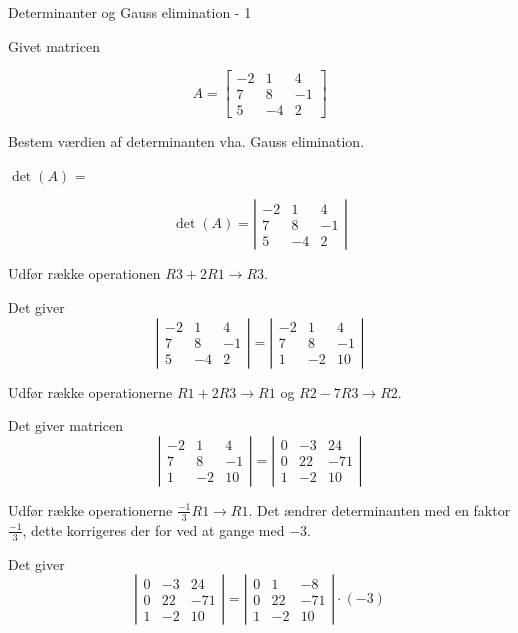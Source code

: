 \documentclass{article}
\begin{document}
\begin{exercise}{Determinanter og Gauss elimination - 1}
	
Givet matricen

\[
A = \left[\begin{array}{rrr}
-2 & 1 & 4 \\ 
7 & 8 & -1 \\
5 & -4 & 2
\end{array} \right]
\]

Bestem værdien af determinanten vha. Gauss elimination.

$\det(A)$ = 


\hint
\[
\det(A) = \left|\begin{array}{rrr}
-2 & 1 & 4 \\ 
7 & 8 & -1 \\
5 & -4 & 2
\end{array} \right|
\]


\hint
Udfør række operationen
$R3 + 2R1 \to R3$.

\hint
Det giver 
\[
\left|\begin{array}{rrr}
-2 & 1 & 4 \\ 
7 & 8 & -1 \\
5 & -4 & 2
\end{array} \right|
=
\left|\begin{array}{rrr}
-2 & 1 & 4 \\ 
7 & 8 & -1 \\
1 & -2 & 10
\end{array} \right|
\]
	
\hint
Udfør række operationerne
$R1 + 2R3 \to R1$ og $R2 - 7R3 \to R2$.

\hint
Det giver matricen
\[
\left|\begin{array}{rrr}
-2 & 1 & 4 \\ 
7 & 8 & -1 \\
1 & -2 & 10
\end{array} \right| = 
\left|\begin{array}{rrr}
0 & -3 & 24 \\ 
0 & 22 & -71 \\
1 & -2 & 10
\end{array} \right|
\]
	
\hint
Udfør række operationerne
$\frac{-1}{3} R1 \to R1$.
Det ændrer determinanten med en faktor $\frac{-1}{3}$, 
dette korrigeres der for ved at gange med $-3$.

\hint
Det giver 
\[
\left|\begin{array}{rrr}
0 & -3 & 24 \\ 
0 & 22 & -71 \\
1 & -2 & 10
\end{array} \right| = 
\left|\begin{array}{rrr}
0 & 1 & -8 \\ 
0 & 22 & -71 \\
1 & -2 & 10
\end{array} \right| \cdot (-3)
\]
	

\end{exercise}
\end{document}
